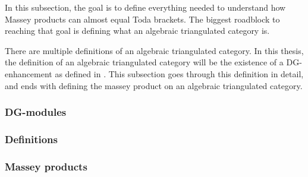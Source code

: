 In this subsection, the goal is to define everything needed to understand how Massey products can almost equal Toda brackets. The biggest roadblock to reaching that goal is defining what an algebraic triangulated category is.

There are multiple definitions of an algebraic triangulated category. In this thesis, the definition of an algebraic triangulated category will be the existence of a DG-enhancement as defined in \cite[Definition 3.1.3]{Jasso-Muro_2023}. This subsection goes through this definition in detail, and ends with defining the massey product on an algebraic triangulated category.

\subsubsection{DG-modules}


\subsubsection{Definitions}


\subsubsection{Massey products}


